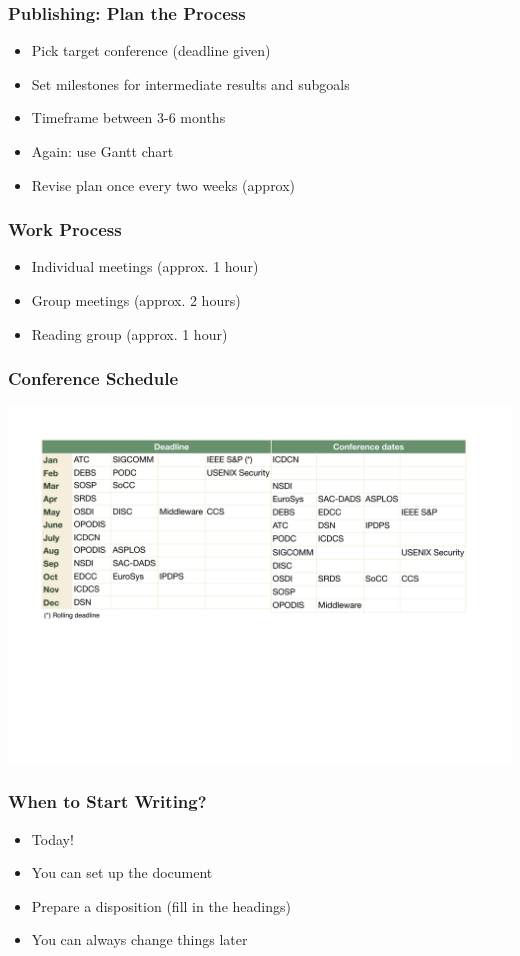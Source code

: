 \documentclass[hyperref={pdfpagelabels=false}, aspectratio=1610]{beamer}
\begin{document}
\begin{frame}
\frametitle{Publishing: Plan the Process}
\begin{block}{}
 \begin{itemize}
  \item Pick target conference (deadline given)
  \item Set milestones for intermediate results and subgoals
  \item Timeframe between 3-6 months
  \item Again: use Gantt chart
  \item Revise plan once every two weeks (approx)
 \end{itemize}
\end{block}
\end{frame}

\begin{frame}
\frametitle{Work Process}
\begin{block}{}
 \begin{itemize}
  \item Individual meetings (approx. 1 hour)
  \item Group meetings (approx. 2 hours)
  \item Reading group (approx. 1 hour)
 \end{itemize}
\end{block}
\end{frame}

\begin{frame}
\frametitle{Conference Schedule}
 \includegraphics[scale=0.48]{fig/ConferenceSchedule}
\end{frame}

\begin{frame}
\frametitle{When to Start Writing?}
\begin{block}{}
 \begin{itemize}
  \item<2-> Today!
  \item<2-> You can set up the document 
  \item<2-> Prepare a disposition (fill in the headings)
  \item<2-> You can always change things later
 \end{itemize}
\end{block}
\end{frame}
\end{document}
